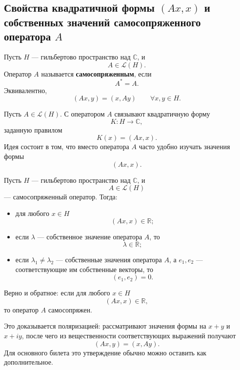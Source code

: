 \subsection{Свойства квадратичной формы \texorpdfstring{\((Ax,x)\)}{(Ax,x)} и собственных значений самосопряженного оператора \texorpdfstring{\(A\)}{A}}

\begin{definition}
	Пусть \(H\) --- гильбертово пространство над \(\mathbb{C}\), и
	\[
	A\in\mathcal{L}(H).
	\]
	Оператор \(A\) называется \textbf{самосопряженным}, если
	\[
	A^*=A.
	\]
	Эквивалентно,
	\[
	(Ax,y)=(x,Ay)
	\qquad
	\forall x,y\in H.
	\]
\end{definition}

\begin{definition}
	Пусть \(A\in\mathcal{L}(H)\). С оператором \(A\) связывают квадратичную форму
	\[
	K:H\to\mathbb{C},
	\]
	заданную правилом
	\[
	K(x)=(Ax,x).
	\]
	Идея состоит в том, что вместо оператора \(A\) часто удобно изучать значения формы
	\[
	(Ax,x).
	\]
\end{definition}

\begin{theorem}
	Пусть \(H\) --- гильбертово пространство над \(\mathbb{C}\), и
	\[
	A\in\mathcal{L}(H)
	\]
	--- самосопряженный оператор. Тогда:
	
	\begin{itemize}
		\item для любого \(x\in H\)
		\[
		(Ax,x)\in\mathbb{R};
		\]
		
		\item если \(\lambda\) --- собственное значение оператора \(A\), то
		\[
		\lambda\in\mathbb{R};
		\]
		
		\item если \(\lambda_1\neq\lambda_2\) --- собственные значения оператора \(A\), а
		\(e_1,e_2\) --- соответствующие им собственные векторы, то
		\[
		(e_1,e_2)=0.
		\]
	\end{itemize}
\end{theorem}

\begin{remark}
	Верно и обратное: если для любого \(x\in H\)
	\[
	(Ax,x)\in\mathbb{R},
	\]
	то оператор \(A\) самосопряжен.
	
	Это доказывается поляризацией: рассматривают значения формы на \(x+y\) и \(x+iy\), после чего
	из вещественности соответствующих выражений получают
	\[
	(Ax,y)=(x,Ay).
	\]
	Для основного билета это утверждение обычно можно оставить как дополнительное.
\end{remark}